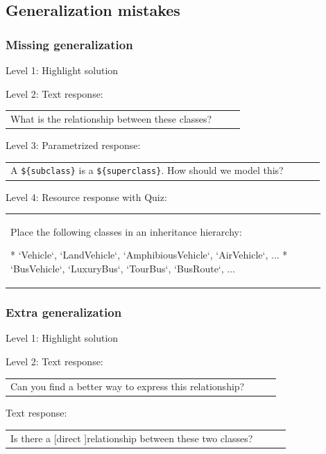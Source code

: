 \subsection{Generalization mistakes}

\subsubsection{Missing generalization}

\noindent Level 1: Highlight solution \medskip

\noindent Level 2: Text response: \medskip

\begin{tabular}{|p{0.9\linewidth}}
What is the relationship between these classes?
\end{tabular} \medskip

\noindent Level 3: Parametrized response: \medskip

\begin{tabular}{|p{0.9\linewidth}}
A \verb|${subclass}| is a \verb|${superclass}|. How should we model this?
\end{tabular} \medskip

\noindent Level 4: Resource response with Quiz: \medskip

\begin{tabular}{|p{0.9\linewidth}}
Place the following classes in an inheritance hierarchy:

* `Vehicle`, `LandVehicle`, `AmphibiousVehicle`, `AirVehicle`, ...
* `BusVehicle`, `LuxuryBus`, `TourBus`, `BusRoute`, ...
\end{tabular} \medskip


\subsubsection{Extra generalization}

\noindent Level 1: Highlight solution \medskip

\noindent Level 2: Text response: \medskip

\begin{tabular}{|p{0.9\linewidth}}
Can you find a better way to express this relationship?
\end{tabular} \medskip

Text response: \medskip

\begin{tabular}{|p{0.9\linewidth}}
Is there a [direct ]relationship between these two classes?
\end{tabular} \medskip

